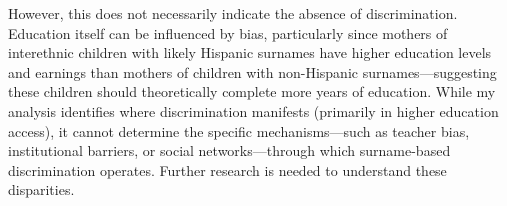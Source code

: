 However, this does not necessarily indicate the absence of discrimination. Education itself can be influenced by bias, particularly since mothers of interethnic children with likely Hispanic surnames have higher education levels and earnings than mothers of children with non-Hispanic surnames—suggesting these children should theoretically complete more years of education. While my analysis identifies where discrimination manifests (primarily in higher education access), it cannot determine the specific mechanisms—such as teacher bias, institutional barriers, or social networks—through which surname-based discrimination operates. Further research is needed to understand these disparities.